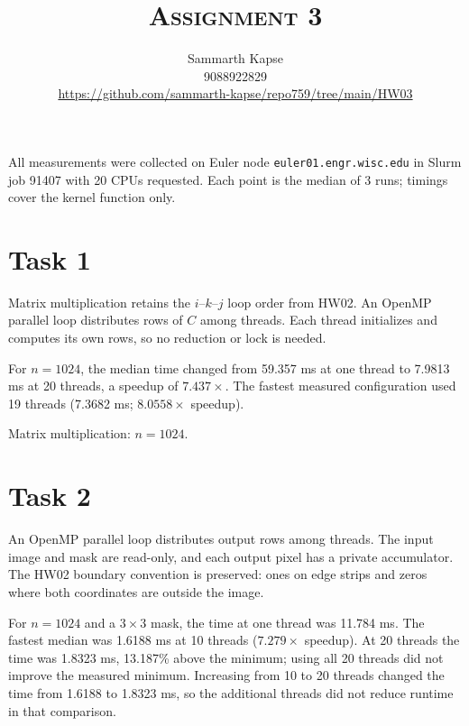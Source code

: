\documentclass[a4paper]{article}
\title{\textsc{Assignment 3}}
\author{Sammarth Kapse \\ 9088922829 \\
\url{https://github.com/sammarth-kapse/repo759/tree/main/HW03}}
\date{}
\begin{document}
\maketitle
All measurements were collected on Euler node \texttt{euler01.engr.wisc.edu} in Slurm job 91407 with 20 CPUs requested. Each point is the median of 3 runs; timings cover the kernel function only.
\section*{Task 1}
Matrix multiplication retains the $i$--$k$--$j$ loop order from HW02. An OpenMP parallel loop distributes rows of $C$ among threads. Each thread initializes and computes its own rows, so no reduction or lock is needed.

For $n=1024$, the median time changed from 59.357 ms at one thread to 7.9813 ms at 20 threads, a speedup of $7.437\times$. The fastest measured configuration used 19 threads (7.3682 ms; $8.0558\times$ speedup).
\begin{center}

{\small Matrix multiplication: $n=1024$.}
\end{center}
\newpage
\section*{Task 2}
An OpenMP parallel loop distributes output rows among threads. The input image and mask are read-only, and each output pixel has a private accumulator. The HW02 boundary convention is preserved: ones on edge strips and zeros where both coordinates are outside the image.

For $n=1024$ and a $3\times3$ mask, the time at one thread was 11.784 ms. The fastest median was 1.6188 ms at 10 threads ($7.279\times$ speedup). At 20 threads the time was 1.8323 ms, 13.187\% above the minimum; using all 20 threads did not improve the measured minimum. Increasing from 10 to 20 threads changed the time from 1.6188 to 1.8323 ms, so the additional threads did not reduce runtime in that comparison.
\end{document}
